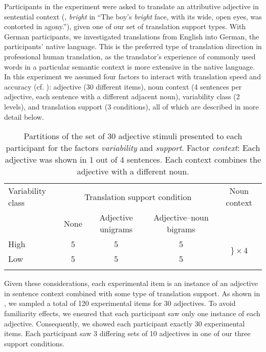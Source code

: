 \documentclass[output=paper]{LSP/langsci}
\begin{document}
Participants in the experiment were asked to translate an attributive
adjective in sentential context (\eg, \emph{bright} in ``The boy's
\emph{bright} face, with its wide, open eyes, was contorted in
agony.''), given one of our set of translation support types.  With
German participants, we investigated translations from English into
German, the participants' native language. This is the preferred type
of translation direction in professional human translation, as the
translator's experience of commonly used words in a particular
semantic context is more extensive in the native language. In this
experiment we assumed four factors to interact with translation speed
and accuracy (cf. ):
adjective (30 different items), noun context (4 sentences per
adjective, each sentence with a different adjacent noun), variability
class (2 levels), and translation support (3 conditions), all of which
are described in more detail below.

\begin{table}
\begin{tabularx}{\textwidth}{Xcccc}
\lsptoprule
Variability class & \multicolumn{3}{c}{Translation support condition}   & Noun context\\
\cmidrule(lr){2-4}
                  & None & Adjective unigrams & Adjective--noun bigrams & \\
\midrule
High              & 5    & 5                  & 5                        & \multirow{2}{*}{$\bigg\}\times 4$}\\
Low               & 5    & 5                  & 5                        & \\
\lspbottomrule
\end{tabularx}
  \caption{Partitions of the set of 30 adjective stimuli presented to each participant for the factors \emph{variability} and \emph{support}. Factor \emph{context}: Each adjective was shown in 1 out of 4 sentences. Each context combines the adjective with a different noun.}
\label{tab:factors}
\end{table}

Given these considerations, each experimental item is an instance of
an adjective in sentence context combined with some type of
translation support. As shown in , we sampled
a total of 120 experimental items for 30 adjectives. To avoid
familiarity effects, we ensured that each participant saw only one
instance of each adjective. Consequently, we showed each participant
exactly 30 experimental items. Each participant saw 3 differing sets
of 10 adjectives in one of our three support conditions.
\end{document}
